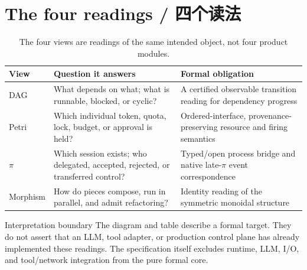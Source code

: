 \section{The four readings / 四个读法}

\begin{table}[H]
\centering
\caption{The four views are readings of the same intended object, not four product modules.}
\label{tab:four-readings}
\begin{tabularx}{\textwidth}{@{}L{0.20\textwidth}L{0.28\textwidth}Y@{}}
\toprule
{}
\textbf{View} & \textbf{Question it answers} & \textbf{Formal obligation} \\
\midrule
DAG & What depends on what; what is runnable, blocked, or cyclic? & A certified observable transition reading for dependency progress \\
Petri & Which individual token, quota, lock, budget, or approval is held? & Ordered-interface, provenance-preserving resource and firing semantics \\
\(\pi\) & Which session exists; who delegated, accepted, rejected, or transferred control? & Typed/open process bridge and native late-\(\pi\) event correspondence \\
Morphism & How do pieces compose, run in parallel, and admit refactoring? & Identity reading of the symmetric monoidal structure \\
\bottomrule
\end{tabularx}
\end{table}

\begin{MWCallout}[MWAmber]{Interpretation boundary}
The diagram and table describe a formal target. They do not assert that an LLM, tool adapter,
or production control plane has already implemented these readings. The specification itself
excludes runtime, LLM, I/O, and tool/network integration from the pure formal core.
\end{MWCallout}
